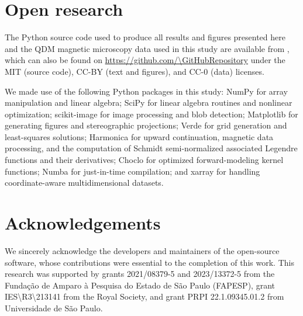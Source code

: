 \section{Open research}

The Python source code used to produce all results and figures presented here and the QDM magnetic microscopy data used in this study are available from \citet{figshare}, which can also be found on \url{https://github.com/\GitHubRepository} under the MIT (source code), CC-BY (text and figures), and CC-0 (data) licenses.

We made use of the following Python packages in this study: NumPy \citep{Harris2020} for array manipulation and linear algebra; SciPy \citep{2020SciPy-NMeth} for linear algebra routines and nonlinear optimization; scikit-image \citep{VanderWalt2014} for image processing and blob detection; Matplotlib \citep{Hunter2007} for generating figures and stereographic projections; Verde \citep{verde2018} for grid generation and least-squares solutions; Harmonica \citep{harmonica2020} for upward continuation, magnetic data processing, and the computation of Schmidt semi-normalized associated Legendre functions and their derivatives; Choclo \citep{choclo2022} for optimized forward-modeling kernel functions; Numba \citep{lam2015numba} for just-in-time compilation; and xarray \citep{hoyer2017xarray} for handling coordinate-aware multidimensional datasets.

\section{Acknowledgements}

We sincerely acknowledge the developers and maintainers of the open-source software, whose contributions were essential to the completion of this work. This research was supported by grants 2021/08379-5 and 2023/13372-5 from the Fundação de Amparo à Pesquisa do Estado de São Paulo (FAPESP), grant IES\textbackslash{}R3\textbackslash{}213141 from the Royal Society, and grant PRPI 22.1.09345.01.2 from Universidade de São Paulo.
